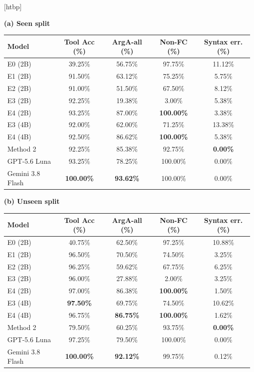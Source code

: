 \documentclass[10pt,twocolumn,a4paper]{article}
\makeatletter
\renewenvironment{table}{\@dblfloat{table}}{\end@dblfloat}
\newcommand{\tabletext}{\small}
\makeatother
\begin{document}
\begin{table}[htbp]
    \centering
    \caption{CustomTools-VI results (800 seen and 800 unseen instances).}
    \label{tab:custom-results}
    \tabletext
    \textbf{(a) Seen split}\\[2pt]
    \begin{tabular*}{\textwidth}{@{\extracolsep{\fill}}lcccc@{}}
        \toprule
        \textbf{Model} & \textbf{Tool Acc (\%)} & \textbf{ArgA-all (\%)} & \textbf{Non-FC (\%)} & \textbf{Syntax err. (\%)} \\
        \midrule
        E0 (2B) & 39.25\% & 56.75\% & 97.75\% & 11.12\% \\
        E1 (2B) & 91.50\% & 63.12\% & 75.25\% & 5.75\% \\
        E2 (2B) & 91.00\% & 51.50\% & 67.50\% & 8.12\% \\
        E3 (2B) & 92.25\% & 19.38\% & 3.00\% & 5.38\% \\
        E4 (2B) & 93.25\% & 87.00\% & \textbf{100.00\%} & 3.38\% \\
        E3 (4B) & 92.00\% & 62.00\% & 71.25\% & 13.38\% \\
        E4 (4B) & 92.50\% & 86.62\% & \textbf{100.00\%} & 5.38\% \\
        Method 2 & 92.25\% & 85.38\% & 92.75\% & \textbf{0.00\%} \\
        GPT-5.6 Luna & 93.25\% & 78.25\% & 100.00\% & 0.00\% \\
        Gemini 3.8 Flash & \textbf{100.00\%} & \textbf{93.62\%} & 100.00\% & 0.00\% \\
        \bottomrule
    \end{tabular*}
    \par\medskip
    \textbf{(b) Unseen split}\\[2pt]
    \begin{tabular*}{\textwidth}{@{\extracolsep{\fill}}lcccc@{}}
        \toprule
        \textbf{Model} & \textbf{Tool Acc (\%)} & \textbf{ArgA-all (\%)} & \textbf{Non-FC (\%)} & \textbf{Syntax err. (\%)} \\
        \midrule
        E0 (2B) & 40.75\% & 62.50\% & 97.25\% & 10.88\% \\
        E1 (2B) & 96.50\% & 70.50\% & 74.50\% & 3.25\% \\
        E2 (2B) & 96.25\% & 59.62\% & 67.75\% & 6.25\% \\
        E3 (2B) & 96.00\% & 27.88\% & 2.00\% & 3.25\% \\
        E4 (2B) & 97.00\% & 86.38\% & \textbf{100.00\%} & 1.50\% \\
        E3 (4B) & \textbf{97.50\%} & 69.75\% & 74.50\% & 10.62\% \\
        E4 (4B) & 96.75\% & \textbf{86.75\%} & \textbf{100.00\%} & 1.62\% \\
        Method 2 & 79.50\% & 60.25\% & 93.75\% & \textbf{0.00\%} \\
        GPT-5.6 Luna & 97.25\% & 79.50\% & 100.00\% & 0.00\% \\
        Gemini 3.8 Flash & \textbf{100.00\%} & \textbf{92.12\%} & 99.75\% & 0.12\% \\
        \bottomrule
    \end{tabular*}
\end{table}
\end{document}
